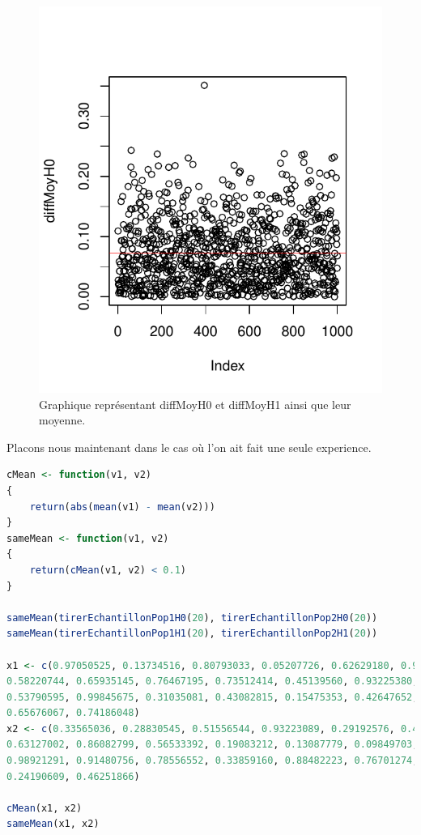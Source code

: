 \begin{figure}[htbp]
	\begin{center}
		\includegraphics[width=12cm]{diffMoy.pdf}
		\caption{Graphique représentant diffMoyH0 et diffMoyH1 ainsi que leur moyenne.}
		\label{fig:diffMoy}
	\end{center}
\end{figure}


Placons nous maintenant dans le cas où l'on ait fait une seule experience.


\begin{lstlisting}[language=R]
cMean <- function(v1, v2)
{
	return(abs(mean(v1) - mean(v2)))
}
sameMean <- function(v1, v2)
{
	return(cMean(v1, v2) < 0.1)
}

sameMean(tirerEchantillonPop1H0(20), tirerEchantillonPop2H0(20))
sameMean(tirerEchantillonPop1H1(20), tirerEchantillonPop2H1(20))

x1 <- c(0.97050525, 0.13734516, 0.80793033, 0.05207726, 0.62629180, 0.93485856,
0.58220744, 0.65935145, 0.76467195, 0.73512414, 0.45139560, 0.93225380,
0.53790595, 0.99845675, 0.31035081, 0.43082815, 0.15475353, 0.42647652,
0.65676067, 0.74186048)
x2 <- c(0.33565036, 0.28830545, 0.51556544, 0.93223089, 0.29192576, 0.43505823,
0.63127002, 0.86082799, 0.56533392, 0.19083212, 0.13087779, 0.09849703,
0.98921291, 0.91480756, 0.78556552, 0.33859160, 0.88482223, 0.76701274,
0.24190609, 0.46251866)

cMean(x1, x2)
sameMean(x1, x2)
\end{lstlisting}


